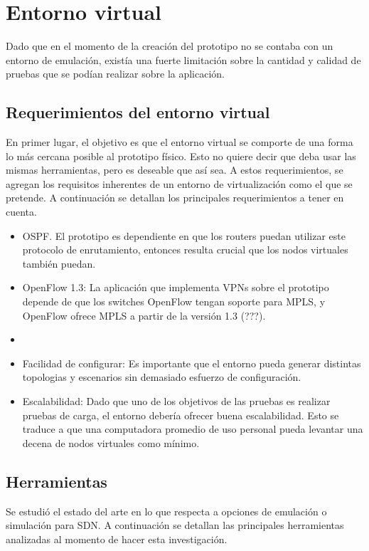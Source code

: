 \section{Entorno virtual}
Dado que en el momento de la creación del prototipo no se contaba con un entorno de emulación, existía una fuerte limitación sobre la cantidad y calidad de pruebas que se podían realizar sobre la aplicación.

\subsection{Requerimientos del entorno virtual}
En primer lugar, el objetivo es que el entorno virtual se comporte de una forma lo más cercana posible al prototipo físico. Esto no quiere decir que deba usar las mismas herramientas, pero es deseable que así sea. A estos requerimientos, se agregan los requisitos inherentes de un entorno de virtualización como el que se pretende. A continuación se detallan los principales requerimientos a tener en cuenta.
\begin{itemize} 
	\item OSPF. El prototipo es dependiente en que los routers puedan utilizar este protocolo de enrutamiento, entonces resulta crucial que los nodos virtuales también puedan.
	\item OpenFlow 1.3: La aplicación que implementa VPNs sobre el prototipo depende de que los switches OpenFlow tengan soporte para MPLS, y OpenFlow ofrece MPLS a partir de la versión 1.3 (???).
	\item 
	\item Facilidad de configurar: Es importante que el entorno pueda generar distintas topologias y escenarios sin demasiado esfuerzo de configuración.
	\item Escalabilidad: Dado que uno de los objetivos de las pruebas es realizar pruebas de carga, el entorno debería ofrecer buena escalabilidad. Esto se traduce a que una computadora promedio de uso personal pueda levantar una decena de nodos virtuales como mínimo.
\end{itemize}

\subsection{Herramientas}
Se estudió el estado del arte en lo que respecta a opciones de emulación o simulación para SDN. A continuación se detallan las principales herramientas analizadas al momento de hacer esta investigación.\\

